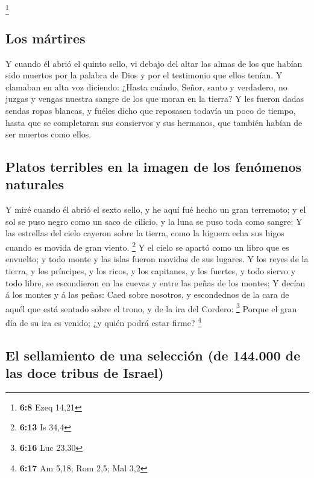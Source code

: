 \footnote{\textbf{6:8} Ezeq 14,21}

\hypertarget{los-muxe1rtires}{%
\subsection{Los mártires}\label{los-muxe1rtires}}

 Y cuando él abrió el quinto sello, vi debajo del altar
las almas de los que habían sido muertos por la palabra de Dios y por el
testimonio que ellos tenían.  Y clamaban en alta voz
diciendo: ¿Hasta cuándo, Señor, santo y verdadero, no juzgas y vengas
nuestra sangre de los que moran en la tierra?  Y les
fueron dadas sendas ropas blancas, y fuéles dicho que reposasen todavía
un poco de tiempo, hasta que se completaran sus consiervos y sus
hermanos, que también habían de ser muertos como ellos.

\hypertarget{platos-terribles-en-la-imagen-de-los-fenuxf3menos-naturales}{%
\subsection{Platos terribles en la imagen de los fenómenos
naturales}\label{platos-terribles-en-la-imagen-de-los-fenuxf3menos-naturales}}

 Y miré cuando él abrió el sexto sello, y he aquí fué
hecho un gran terremoto; y el sol se puso negro como un saco de cilicio,
y la luna se puso toda como sangre;  Y las estrellas del
cielo cayeron sobre la tierra, como la higuera echa sus higos cuando es
movida de gran viento. \footnote{\textbf{6:13} Is 34,4} 
Y el cielo se apartó como un libro que es envuelto; y todo monte y las
islas fueron movidas de sus lugares.  Y los reyes de la
tierra, y los príncipes, y los ricos, y los capitanes, y los fuertes, y
todo siervo y todo libre, se escondieron en las cuevas y entre las peñas
de los montes;  Y decían á los montes y á las peñas: Caed
sobre nosotros, y escondednos de la cara de aquél que está sentado sobre
el trono, y de la ira del Cordero: \footnote{\textbf{6:16} Luc 23,30}
 Porque el gran día de su ira es venido; ¿y quién podrá
estar firme? \footnote{\textbf{6:17} Am 5,18; Rom 2,5; Mal 3,2}

\hypertarget{el-sellamiento-de-una-selecciuxf3n-de-144.000-de-las-doce-tribus-de-israel}{%
\subsection{El sellamiento de una selección (de 144.000 de las doce
tribus de
Israel)}\label{el-sellamiento-de-una-selecciuxf3n-de-144.000-de-las-doce-tribus-de-israel}}


